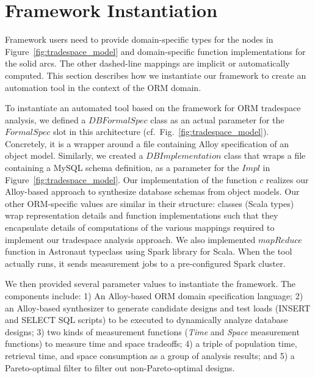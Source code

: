 \documentclass{sig-alternate}
\begin{document}
\section{Framework Instantiation}
\label{tool_implementation}
Framework users need to provide domain-specific types for the nodes in Figure~\ref{fig:tradespace_model} and domain-specific function implementations for the solid arcs. The other dashed-line mappings are implicit or automatically computed. %
This section describes how we instantiate our framework to create an automation tool in the context of the ORM domain. 

To instantiate an automated tool based on the framework for ORM tradespace analysis, we defined a $DBFormalSpec$ class as an actual parameter for the $Formal Spec$ slot in this architecture (cf.~Fig.~\ref{fig:tradespace_model}). Concretely, it is a wrapper around a file containing Alloy specification of an object model. Similarly, we created a $DBImplementation$ class that wraps a file containing a MySQL schema definition, as a parameter for the $Impl$ in Figure~\ref{fig:tradespace_model}. Our implementation of the function $c$ realizes our Alloy-based approach to synthesize database schemas from object models. Our other ORM-specific values are similar in their structure: classes (Scala types) wrap representation details and function implementations such that they encapsulate details of computations of the various mappings required to implement our tradespace analysis approach. We also implemented $mapReduce$ function in Astronaut typeclass using Spark library for Scala. When the tool actually runs, it sends measurement jobs to a pre-configured Spark cluster.

We then provided several parameter values to instantiate the framework. The components include: 1) An Alloy-based ORM domain specification language; 2) an Alloy-based synthesizer to generate candidate designs and test loads (INSERT and SELECT SQL scripts) to be executed to dynamically analyze database designs; 3) two kinds of measurement functions ({\em Time} and {\em Space} measurement functions) to measure time and space tradeoffs; 4) a triple of population time, retrieval time, and space consumption as a group of analysis results; and 5) a Pareto-optimal filter to filter out non-Pareto-optimal designs.
\end{document}
